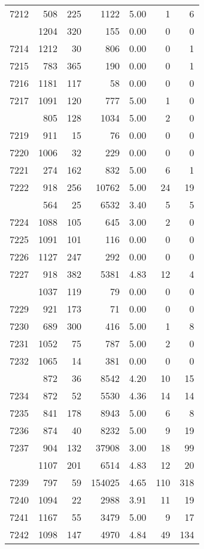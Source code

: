 \documentclass[
]{article}
\begin{document}
\begin{table}
\begin{tabular}[t]{lrrrrrr}
7212 & 508 & 225 & 1122 & 5.00 & 1 & 6\\
\addlinespace
7213 & 1204 & 320 & 155 & 0.00 & 0 & 0\\
7214 & 1212 & 30 & 806 & 0.00 & 0 & 1\\
7215 & 783 & 365 & 190 & 0.00 & 0 & 1\\
7216 & 1181 & 117 & 58 & 0.00 & 0 & 0\\
7217 & 1091 & 120 & 777 & 5.00 & 1 & 0\\
\addlinespace
7218 & 805 & 128 & 1034 & 5.00 & 2 & 0\\
7219 & 911 & 15 & 76 & 0.00 & 0 & 0\\
7220 & 1006 & 32 & 229 & 0.00 & 0 & 0\\
7221 & 274 & 162 & 832 & 5.00 & 6 & 1\\
7222 & 918 & 256 & 10762 & 5.00 & 24 & 19\\
\addlinespace
7223 & 564 & 25 & 6532 & 3.40 & 5 & 5\\
7224 & 1088 & 105 & 645 & 3.00 & 2 & 0\\
7225 & 1091 & 101 & 116 & 0.00 & 0 & 0\\
7226 & 1127 & 247 & 292 & 0.00 & 0 & 0\\
7227 & 918 & 382 & 5381 & 4.83 & 12 & 4\\
\addlinespace
7228 & 1037 & 119 & 79 & 0.00 & 0 & 0\\
7229 & 921 & 173 & 71 & 0.00 & 0 & 0\\
7230 & 689 & 300 & 416 & 5.00 & 1 & 8\\
7231 & 1052 & 75 & 787 & 5.00 & 2 & 0\\
7232 & 1065 & 14 & 381 & 0.00 & 0 & 0\\
\addlinespace
7233 & 872 & 36 & 8542 & 4.20 & 10 & 15\\
7234 & 872 & 52 & 5530 & 4.36 & 14 & 14\\
7235 & 841 & 178 & 8943 & 5.00 & 6 & 8\\
7236 & 874 & 40 & 8232 & 5.00 & 9 & 19\\
7237 & 904 & 132 & 37908 & 3.00 & 18 & 99\\
\addlinespace
7238 & 1107 & 201 & 6514 & 4.83 & 12 & 20\\
7239 & 797 & 59 & 154025 & 4.65 & 110 & 318\\
7240 & 1094 & 22 & 2988 & 3.91 & 11 & 19\\
7241 & 1167 & 55 & 3479 & 5.00 & 9 & 17\\
7242 & 1098 & 147 & 4970 & 4.84 & 49 & 134\\

\end{tabular}
\end{table}
\end{document}
